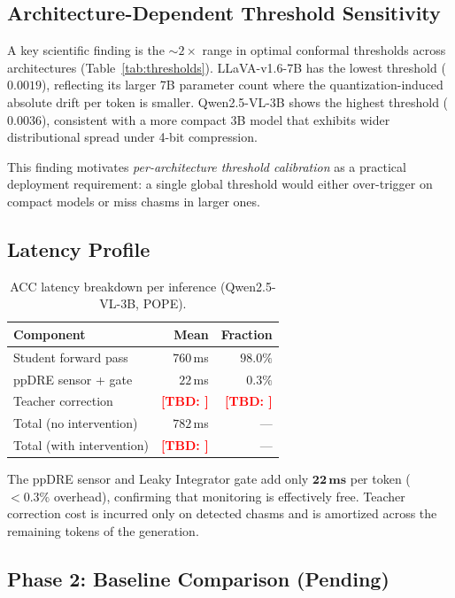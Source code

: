 \documentclass[runningheads]{llncs}
\newcommand{\TBD}[1]{\textcolor{red}{\textbf{[TBD: #1]}}}
\begin{document}
\subsection{Architecture-Dependent Threshold Sensitivity}

A key scientific finding is the $\sim\!2\times$ range in optimal conformal
thresholds across architectures (Table~\ref{tab:thresholds}).
LLaVA-v1.6-7B has the lowest threshold ($0.0019$), reflecting its larger
7B parameter count where the quantization-induced absolute drift per token
is smaller. Qwen2.5-VL-3B shows the highest threshold ($0.0036$), consistent
with a more compact 3B model that exhibits wider distributional spread under
4-bit compression.

This finding motivates \emph{per-architecture threshold calibration} as a
practical deployment requirement: a single global threshold would either
over-trigger on compact models or miss chasms in larger ones.

\subsection{Latency Profile}

\begin{table}[t]
  \centering
  \caption{ACC latency breakdown per inference (Qwen2.5-VL-3B, POPE).}
  \label{tab:latency}
  \small
  \begin{tabular}{@{}lrr@{}}
    \toprule
    \textbf{Component} & \textbf{Mean} & \textbf{Fraction} \\
    \midrule
    Student forward pass & $760$\,ms & $98.0\%$ \\
    ppDRE sensor + gate  & $22$\,ms   & $0.3\%$ \\
    Teacher correction   & \TBD{} & \TBD{} \\
    \midrule
    Total (no intervention) & $782$\,ms & --- \\
    Total (with intervention) & \TBD{} & --- \\
    \bottomrule
  \end{tabular}
\end{table}

The ppDRE sensor and Leaky Integrator gate add only $\mathbf{22\,ms}$ per
token ($<0.3\%$ overhead), confirming that monitoring is effectively free.
Teacher correction cost is incurred only on detected chasms and is amortized
across the remaining tokens of the generation.

\subsection{Phase 2: Baseline Comparison (Pending)}
\end{document}
